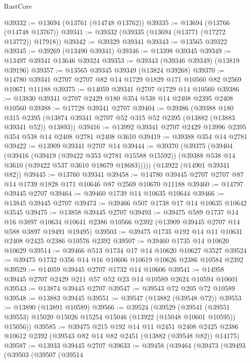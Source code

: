 \begin{lexlean}{RustCore}
\begin{coremodule}
@39332 := @13694 (@13761 (@14748 @13762))
@39335 := @13694 (@13766 (@14748 @13767))
@39341 := @39332 (@39335 (@13694 (@13771 (@17272 @13772)) @17918))
@39342 := @39329 @39341
@39343 := @13565 @39322
@39345 := @39269 (@13490 @39341)
@39346 := @13398 @39345
@39349 := @13497 @39341 @13646 @39324
@39353 := @39343 (@39346 @39349) (@13819 @39196)
@39357 := @13565 @39345 @39349 (@13824 @39268)
@39370 := @14780 @39341 @2707 @2707 @82 @14 @1729 @1829 @171 @10560 @82 @2569 @10671 @11188
@39375 := @14059 @39341 @2707 @1729 @14 @10560
@39386 := @13830 @39341 @2707 @2429 @180 @354 @538 @14 @2408 @2395 @2408 @10560
@39388 := @17728 @39341 @2707
@39404 := @39386
    (@39388
      @180
      @315
      @2395
      (@13874 @39341 @2707 @52 @315 @52 @2395 (@13882 (@13883 @39341 @52)) @13893))
@39416 := @13992 @39341 @2707 @2429 @13996 @2395 @354 @538 @14 @2408 @2781 @2408 @3610
@39419 := @39388 @354 @14 @2781
@39422 := @13909 @39341 @2707 @14
@39444 := @39370
    (@39375
      (@39404
        (@39416
          (@39419 (@39422 @353 @2781 @15588 @15592))
          (@39388 @538 @14 @3610 (@39422 @537 @3610 @18679 @18683)))))
    (@13922 (@14901 @39341 @82))
@39445 := @13760 @39341
@39458 := @14780 @39445 @2707 @2707 @87 @14 @1739 @1828 @171 @10646 @87 @2569 @10670 @11188
@39460 := @14797 @39445 @2707
@39464 := @39460 @1739 @14 @10635 @10644
@39466 := @13845 @39445 @2707
@39473 := @39466 @507 @1738 @17 @14 @10635 @10642 @3545
@39475 := @13858 @39445 @2707
@39493 := @39475
    @589
    @1737
    @14
    @16
    @3897
    @10634
    @10641
    @2386
    @10566
    @2392
    (@13909 @39445 @2707 @14 @588 @3897 @19491 @19495)
@39503 := @39475 @1735 @192 @14 @11 @10631 @2408 @2425 @2386 @10576 @2392
@39507 := @39460 @1735 @14 @10620 @10629
@39514 := @39466 @513 @1734 @17 @14 @10620 @10627 @3527
@39524 := @39475 @1732 @356 @14 @16 @10606 @10619 @10626 @2386 @10584 @2392
@39529 := @14059 @39445 @2707 @1732 @14 @10606
@39541 := @14958 @39445 @2707 @2429 @211 @57 @52 @23 @14 @10589 @2624 @10594 @10601
@39543 := @13874 @39445 @2707
@39547 := @39543 @72 @205 @72 @10589
@39548 := @13883 @39445
@39551 := @39547 (@13882 (@39548 @72))
@39553 := @13890 (@13891 @10589)
@39566 := @39524
    (@39529
      (@39541 (@39551 @39553) @15020 @15026 @15254 @15046 (@13922 (@15048 @10601 @10595)) @15056))
@39585 := @39475
    @215
    @192
    @14
    @11
    @2451
    @2408
    @2425
    @2386
    @10612
    @2392
    (@39543 @82 @14 @82 @2451 (@13882 (@39548 @82)) @14175)
@39587 := @13933 @39445 @2707
@39633 := @39458
    (@39464
      (@39473
        (@39493
          (@39503
            (@39507
              (@39514

\end{coremodule}
\end{lexlean}
